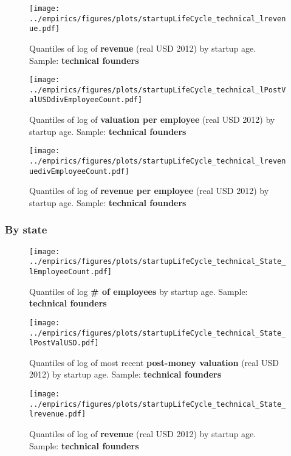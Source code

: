 \documentclass[12pt,english]{article}
\theoremstyle{remark}
\let\Oldsubsubsection\subsubsection
\renewcommand{\subsubsection}{\FloatBarrier\Oldsubsubsection}
\begin{document}
\begin{figure}[!htb]
	\centering
	\texttt{[image: ../empirics/figures/plots/startupLifeCycle\_technical\_lrevenue.pdf]}
	\caption{Quantiles of log of \textbf{revenue} (real USD 2012) by startup age. 
		Sample: \textbf{technical founders}}
\end{figure}

\begin{figure}[!htb]
	\centering
	\texttt{[image: ../empirics/figures/plots/startupLifeCycle\_technical\_lPostValUSDdivEmployeeCount.pdf]}
	\caption{Quantiles of log of \textbf{valuation per employee} (real USD 2012) by startup age. 
		Sample: \textbf{technical founders}}
\end{figure}

\begin{figure}[!htb]
	\centering
	\texttt{[image: ../empirics/figures/plots/startupLifeCycle\_technical\_lrevenuedivEmployeeCount.pdf]}
	\caption{Quantiles of log of \textbf{revenue per employee} (real USD 2012) by startup age. 
		Sample: \textbf{technical founders}}
\end{figure}

\subsubsection{By state}

\begin{figure}[!htb]
	\centering
	\texttt{[image: ../empirics/figures/plots/startupLifeCycle\_technical\_State\_lEmployeeCount.pdf]}
	\caption{Quantiles of log \textbf{\# of employees} by startup age. 
		Sample: \textbf{technical founders}}
\end{figure}

\begin{figure}[!htb]
	\centering
	\texttt{[image: ../empirics/figures/plots/startupLifeCycle\_technical\_State\_lPostValUSD.pdf]}
	\caption{Quantiles of log of most recent \textbf{post-money valuation} (real USD 2012) by startup age. 
		Sample: \textbf{technical founders}}
\end{figure}

\begin{figure}[!htb]
	\centering
	\texttt{[image: ../empirics/figures/plots/startupLifeCycle\_technical\_State\_lrevenue.pdf]}
	\caption{Quantiles of log of \textbf{revenue} (real USD 2012) by startup age. 
		Sample: \textbf{technical founders}}
\end{figure}
\end{document}
